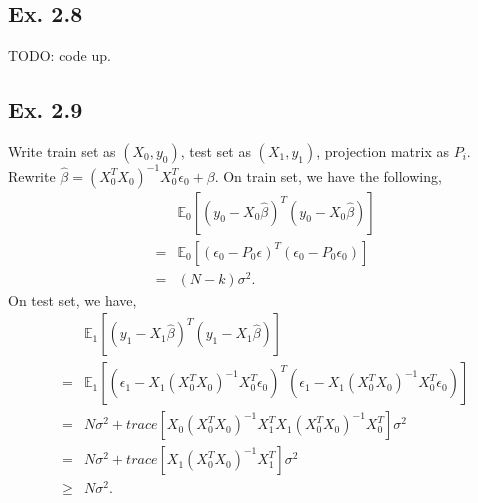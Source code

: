 \subsection*{Ex. 2.8}
TODO: code up.

\subsection*{Ex. 2.9}
Write train set as $(X_0, y_0)$, test set as $(X_1, y_1)$, projection matrix as $P_i$.
Rewrite $\hat{\beta} = (X_0^T X_0)^{-1}X_0^{T}\epsilon_0 + \beta.$ On train set, we have the following, 
\begin{eqnarray*}
&&\mathbb{E}_{0}\left[(y_0 - X_0\hat{\beta})^T(y_0 - X_0\hat{\beta})\right]\\
&=&\mathbb{E}_{0}\left[(\epsilon_0 - P_0\epsilon)^T(\epsilon_0 - P_0\epsilon_0)\right]\\
&=&(N - k)\sigma^2.
\end{eqnarray*}
On test set, we have,
\begin{eqnarray*}
&&\mathbb{E}_{1}\left[(y_1 - X_1\hat{\beta})^T(y_1 - X_1\hat{\beta})\right]\\
&=&\mathbb{E}_{1}\left[(\epsilon_1 - X_1(X_0^TX_0)^{-1}X_0^T\epsilon_0)^T(\epsilon_1 - X_1(X_0^TX_0)^{-1}X_0^T\epsilon_0)\right]\\
&=&N\sigma^2 + trace\left[X_0(X_0^TX_0)^{-1}X_1^TX_1(X_0^TX_0)^{-1}X_0^T\right]\sigma^2\\
&=&N\sigma^2 + trace\left[X_1(X_0^TX_0)^{-1}X_1^T\right]\sigma^2\\
&\geq& N\sigma^2.
\end{eqnarray*}